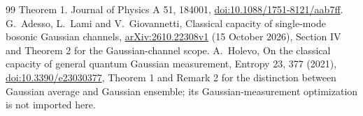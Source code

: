 \documentclass[11pt]{article}
\begin{document}
\begin{thebibliography}{99}
Theorem 1. Journal of Physics A 51, 184001,
\href{https://doi.org/10.1088/1751-8121/aab7ff}{doi:10.1088/1751-8121/aab7ff}.
 G.~Adesso, L.~Lami and V.~Giovannetti,
Classical capacity of single-mode bosonic Gaussian channels,
\href{https://arxiv.org/abs/2610.22308v1}{arXiv:2610.22308v1}
(15 October 2026), Section IV and Theorem 2 for the Gaussian-channel scope.
 A.~Holevo, On the classical capacity of
general quantum Gaussian measurement, Entropy 23, 377 (2021),
\href{https://doi.org/10.3390/e23030377}{doi:10.3390/e23030377},
Theorem 1 and Remark 2 for the distinction between Gaussian average
and Gaussian ensemble; its Gaussian-measurement optimization is not
imported here.
\end{thebibliography}
\end{document}
